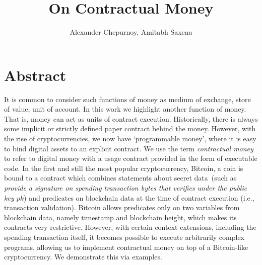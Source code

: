\documentclass[]{llncs}   %
\begin{document}
\title{On Contractual Money}

\author{Alexander Chepurnoy, Amitabh Saxena}

\maketitle

\section{Abstract}

It is common to consider such functions of money as medium of exchange, store of value, unit of account.
In this work we highlight another function of money. That is, money can act as units of contract execution. 
Historically, there is always some implicit or strictly defined paper contract behind the money.
However, with the rise of cryptocurrencies, we now have `programmable money', where it is easy to bind digital assets to an explicit contract. We use the term {\em contractual money} to refer to digital money with a usage contract provided in the form of executable code. In the first and still the most popular cryptocurrency, Bitcoin, a coin is bound to a contract which combines
statements about secret data~(such as {\em provide a signature on spending transaction bytes that verifies under the public key $pk$}) and predicates on blockchain data at the time of contract execution (i.e., transaction validation).  Bitcoin allows predicates only on two variables from blockchain data, namely timestamp and blockchain height, which makes its contracts very restrictive.
However, with certain context extensions, including the spending transaction itself, it becomes possible to execute
arbitrarily complex programs, allowing us to implement contractual money on top of a Bitcoin-like cryptocurrency. We demonstrate this via examples.
\end{document}
